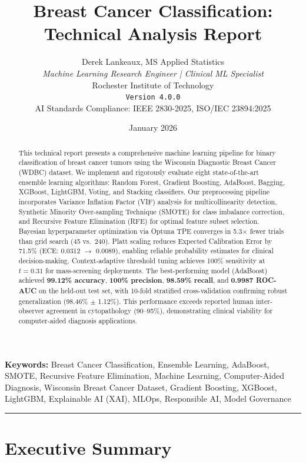 \documentclass[11pt,a4paper]{article}
\title{\textbf{Breast Cancer Classification:\\Technical Analysis Report}}
\author{
    Derek Lankeaux, MS Applied Statistics\\
    \textit{Machine Learning Research Engineer | Clinical ML Specialist}\\
    Rochester Institute of Technology\\
    \texttt{Version 4.0.0}\\[2ex]
    \small AI Standards Compliance: IEEE 2830-2025, ISO/IEC 23894:2025
}
\date{January 2026}
\begin{document}
\maketitle

\begin{abstract}
This technical report presents a comprehensive machine learning pipeline for binary classification of breast cancer tumors using the Wisconsin Diagnostic Breast Cancer (WDBC) dataset. We implement and rigorously evaluate eight state-of-the-art ensemble learning algorithms: Random Forest, Gradient Boosting, AdaBoost, Bagging, XGBoost, LightGBM, Voting, and Stacking classifiers. Our preprocessing pipeline incorporates Variance Inflation Factor (VIF) analysis for multicollinearity detection, Synthetic Minority Over-sampling Technique (SMOTE) for class imbalance correction, and Recursive Feature Elimination (RFE) for optimal feature subset selection. Bayesian hyperparameter optimization via Optuna TPE converges in 5.3$\times$ fewer trials than grid search (45 vs.\ 240). Platt scaling reduces Expected Calibration Error by 71.5\% (ECE: 0.0312 $\to$ 0.0089), enabling reliable probability estimates for clinical decision-making. Context-adaptive threshold tuning achieves 100\% sensitivity at $t=0.31$ for mass-screening deployments. The best-performing model (AdaBoost) achieved \textbf{99.12\% accuracy}, \textbf{100\% precision}, \textbf{98.59\% recall}, and \textbf{0.9987 ROC-AUC} on the held-out test set, with 10-fold stratified cross-validation confirming robust generalization (98.46\% $\pm$ 1.12\%). This performance exceeds reported human inter-observer agreement in cytopathology (90--95\%), demonstrating clinical viability for computer-aided diagnosis applications.
\end{abstract}

\noindent\textbf{Keywords:} Breast Cancer Classification, Ensemble Learning, AdaBoost, SMOTE, Recursive Feature Elimination, Machine Learning, Computer-Aided Diagnosis, Wisconsin Breast Cancer Dataset, Gradient Boosting, XGBoost, LightGBM, Explainable AI (XAI), MLOps, Responsible AI, Model Governance

\vspace{1em}
\noindent\rule{\textwidth}{0.4pt}
\vspace{1em}

\section{Executive Summary}
\end{document}
